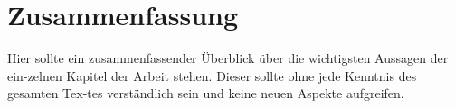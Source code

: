 \chapter{Zusammenfassung}
Hier sollte ein zusammenfassender Überblick über die wichtigsten Aussagen der ein-zelnen Kapitel der Arbeit stehen. Dieser sollte ohne jede Kenntnis des gesamten Tex-tes verständlich sein und keine neuen Aspekte aufgreifen.